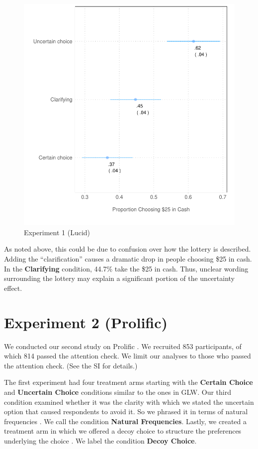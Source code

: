 \documentclass[12pt, letterpaper]{article}
\begin{document}
\begin{figure}[h]
    \centering
    \includegraphics{figs/lucid_exp.pdf}
    \caption{Experiment 1 (Lucid)}
    \label{fig:exp_1_lucid}
\end{figure}

As noted above, this could be due to confusion over how the lottery is described. Adding the ``clarification'' causes a dramatic drop in people choosing \$25 in cash. In the \textbf{Clarifying} condition, 44.7\% take the \$25 in cash. Thus, unclear wording surrounding the lottery may explain a significant portion of the uncertainty effect.

\section*{Experiment 2 (Prolific)}

We conducted our second study on Prolific \citep{palan2018prolific}. We recruited 853 participants, of which 814 passed the attention check. We limit our analyses to those who passed the attention check. (See the SI for details.)

The first experiment had four treatment arms starting with the \textbf{Certain Choice} and \textbf{Uncertain Choice} conditions similar to the ones in GLW. Our third condition examined whether it was the clarity with which we stated the uncertain option that caused respondents to avoid it. So we phrased it in terms of natural frequencies \citep{gigerenzer2011natural}. We call the condition \textbf{Natural Frequencies}. Lastly, we created a treatment arm in which we offered a decoy choice to structure the preferences underlying the choice \citep{ariely2008predictably}. We label the condition \textbf{Decoy Choice}.
\end{document}
